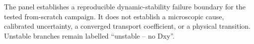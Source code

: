 The panel establishes a reproducible dynamic-stability failure boundary for the tested from-scratch campaign. It does not establish a microscopic cause, calibrated uncertainty, a converged transport coefficient, or a physical transition. Unstable branches remain labelled ``unstable -- no Dxy''.
